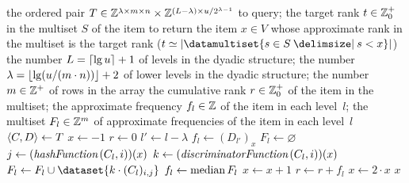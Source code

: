 \begin{algorithmic}[1]
  \In the ordered pair \( \cramped{T \in \integers^{\lambda \times m \times n} \times \integers^{(L - \lambda) \times u / 2^{\lambda - 1}}} \) to query; the target rank \( t \in \mathbb{Z}_{0}^{+} \) in the multiset \( S \) of the item to return
  \Out the item \( x \in V \) whose approximate rank in the multiset is the target rank (\( t \simeq \cardinality{\datamultiset{s \in S \suchthat s < x}} \))
  \Constant the number \( L = \lceil\lg u\rceil + 1 \) of levels in the dyadic structure; the number \( \lambda = \lfloor\lg (u / (m \cdot n))\rfloor + 2 \) of lower levels in the dyadic structure; the number \( m \in \mathbb{Z}^{+} \) of rows in the array
  \Local the cumulative rank \( r \in \mathbb{Z}_{0}^{+} \) of the item in the multiset; the approximate frequency \( f_{l} \in \mathbb{Z} \) of the item in each level~\( l \); the multiset \( F_{l} \in \mathbb{Z}^{m} \) of approximate frequencies of the item in each level~\( l \)
    \State \( \langle C, D\rangle \gets T \)
    \State \( x \gets -1 \)
    \State \( r \gets 0 \)
        \State \( l' \gets l - \lambda \)
        \State \( f_{l} \gets (D_{l'})_{x} \)
      \Else
        \State \( F_{l} \gets \varnothing \)
          \State \( j \gets (\hashFunction (C_{l}, i))(x) \)
          \State \( k \gets (\discriminatorFunction (C_{l}, i))(x) \)
          \State \( F_{l} \gets F_{l} \cup \dataset{k \cdot (C_{l})_{i, j}} \)
        \EndFor
        \State \( f_{l} \gets \operatorname*{median} F_{l} \)
      \EndIf
        \State \( x \gets x + 1 \)
        \State \( r \gets r + f_{l} \)
      \EndIf
        \State \( x \gets 2 \cdot x \) \label{line:dyadic-count-sketch-extended-quantile-query-multiplication}
      \EndIf
    \EndFor
    \State \Return \( x \)
  \EndFunction
\end{algorithmic}
